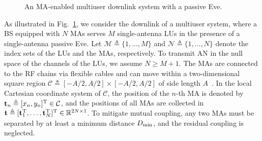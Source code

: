 \documentclass[journal]{IEEEtran}
\newcommand{\phoneicon}[2]{%
  \begin{scope}[shift={#1}]
    \draw[rounded corners=1.3pt, line width=0.5pt, fill=white] (-0.135,-0.25) rectangle (0.135,0.25);
    \fill[#2] (-0.1,-0.17) rectangle (0.1,0.2);
    \fill[black!55] (0,-0.212) circle (0.02);
  \end{scope}}
\begin{document}
\begin{figure}[t]
\caption{An MA-enabled multiuser downlink system with a passive Eve.}
\label{fig:system}
\end{figure}

As illustrated in Fig.~\ref{fig:system}, we consider the downlink of a multiuser system, where a BS equipped with $N$ MAs serves $M$ single-antenna LUs in the presence of a single-antenna passive Eve. Let $\mathcal M\triangleq\{1,\ldots,M\}$ and $\mathcal N\triangleq\{1,\ldots,N\}$ denote the index sets of the LUs and the MAs, respectively. To transmit AN in the null space of the channels of the LUs, we assume $N\ge M+1$. The MAs are connected to the RF chains via flexible cables and can move within a two-dimensional square region $\mathcal C\triangleq[-A/2,A/2]\times[-A/2,A/2]$ of side length $A$~\cite{ZhuMag2024,ZhuTWC2024Model}. In the local Cartesian coordinate system of $\mathcal C$, the position of the $n$-th MA is denoted by $\mathbf{t}_n\triangleq[x_n,y_n]^{\mathrm T}\in\mathcal C$, and the positions of all MAs are collected in $\mathbf{t}\triangleq[\mathbf{t}_1^{\mathrm T},\ldots,\mathbf{t}_N^{\mathrm T}]^{\mathrm T}\in\mathbb R^{2N\times1}$. To mitigate mutual coupling, any two MAs must be separated by at least a minimum distance $D_{\min}$, and the residual coupling is neglected.
\end{document}
